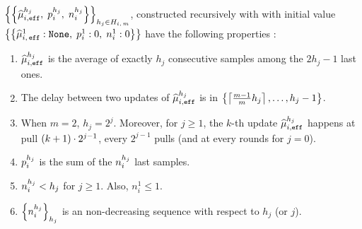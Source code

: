 \begin{proposition}
\label{prop:effu}
 $\left\{\left\{  \widehat{\mu}_{i,\texttt{eff}}^{h_j},\; p_i^{h_j}, \; n_i^{h_j} \right\}\right\}_{h_j \in H_{i,\,m}}$, constructed recursively with \EFF with initial value $\left\{\left\{  \widehat{\mu}_{i,\,\texttt{eff}}^1 : \texttt{None},\; p_i^{1} :0 , \; n_i^{1}:0 \right\}\right\}$ have the following properties :
 \begin{enumerate}[topsep=0pt]
  \item $\widehat{\mu}_{i,\texttt{eff}}^{h_j}$ is the average of exactly $h_j$ consecutive samples among the $2h_j -1$ last ones. \label{list:effu-hmu}
  \item The delay between two updates of $\widehat{\mu}_{i,\texttt{eff}}^{h_j}$ is in $\left\{\left\lceil\frac{m-1}{m} h_j\right\rceil, \dots, h_j -1\right\}$.\label{list:effu-delay}
  \item When $m = 2$, $h_j = 2^{j}$. Moreover, for $j\geq1$,  the $k$-th update $\widehat{\mu}_{i,\texttt{eff}}^{h_j}$ happens at pull $ \left(k+1\right) \cdot 2^{j-1}$, \ie every $2^{j-1}$ pulls (and at every rounds for $j=0$).\label{list:effu-m2}
  \item $p_i^{h_j}$ is the sum of the $n_i^{h_j}$ last samples. \label{list:effu-p}
  \item $n_i^{h_j} < h_j$ for $j\geq 1$. Also, $n_i^1 \leq 1$.\label{list:effu-n1}
  \item $\left\{ n_i^{h_j} \right\}_{h_j}$ is an non-decreasing sequence with respect to $h_j$ (or $j$).\label{list:effu-n2}
 \end{enumerate}
\end{proposition}
